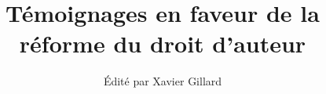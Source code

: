 \documentclass[11pt,listof=totoc,bibligraphy=totoc]{scrbook}
\title{Témoignages en faveur de la réforme du droit d'auteur}
\author{Édité par Xavier Gillard}
\begin{document}
\renewcommand{\labelitemi}{$\bullet$}

\maketitle



\tableofcontents











\end{document}
